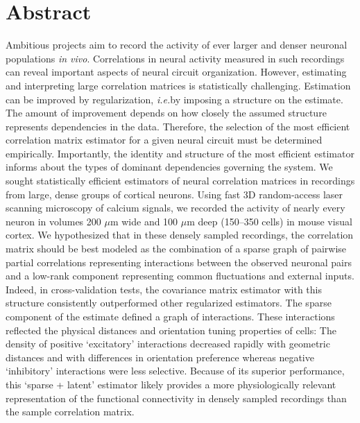 \section*{Abstract}
Ambitious projects aim to record the activity of ever larger and denser neuronal populations \emph{in vivo}.  Correlations in neural activity measured in such recordings can reveal important aspects of  neural circuit organization.  However, estimating and interpreting large correlation matrices is statistically challenging.  Estimation can be improved by regularization, \emph{i.e.}\;by imposing a structure on the estimate.  The amount of improvement depends on how closely the assumed structure represents dependencies in the data. Therefore, the selection of the most efficient correlation matrix estimator for a given neural circuit must be determined empirically.  Importantly, the identity and structure of the most efficient estimator informs about the types of dominant dependencies governing the system.
We sought statistically efficient estimators of neural correlation matrices in recordings from large, dense groups of cortical neurons.  Using fast 3D random-access laser scanning microscopy of calcium signals, we recorded the activity of nearly every neuron in volumes 200 $\mu$m wide and 100 $\mu$m deep (150--350 cells) in mouse visual cortex.  We hypothesized that in these densely sampled recordings, the correlation matrix should be best modeled as the combination of a sparse graph of pairwise partial correlations representing interactions between the observed neuronal pairs and a low-rank component representing common fluctuations and external inputs.  Indeed, in cross-validation tests, the covariance matrix estimator with this structure consistently outperformed other regularized estimators. The sparse component of the estimate defined a graph of interactions. These interactions reflected the physical distances and orientation tuning properties of cells: The density of positive `excitatory' interactions decreased rapidly with geometric distances and with differences in orientation preference whereas negative `inhibitory' interactions were less selective.  Because of its superior performance, this `sparse + latent' estimator likely provides a more physiologically relevant representation of the functional connectivity in densely sampled recordings than the sample correlation matrix.

